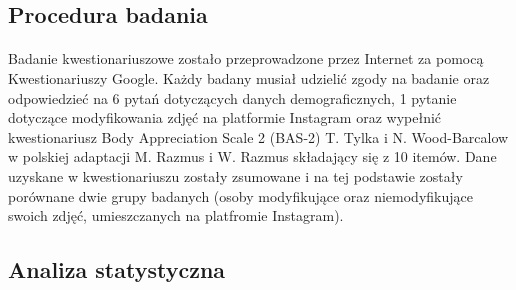 \documentclass[12pt,a4paper,final,oneside,onecolumn,titlepage]{article}
\begin{document}
\subsection*{\normalsize{\textbf{Procedura badania}}}
\paragraph{}
Badanie kwestionariuszowe zostało przeprowadzone przez Internet za pomocą Kwestionariuszy Google. Każdy badany musiał udzielić zgody na badanie oraz odpowiedzieć na 6 pytań dotyczących danych demograficznych, 1 pytanie dotyczące modyfikowania zdjęć na platformie Instagram oraz wypełnić kwestionariusz Body Appreciation Scale 2 (BAS-2) T. Tylka i N. Wood-Barcalow w polskiej adaptacji M. Razmus i W. Razmus składający się z 10 itemów. Dane uzyskane w kwestionariuszu zostały zsumowane i na tej podstawie zostały porównane dwie grupy badanych (osoby modyfikujące oraz niemodyfikujące swoich zdjęć, umieszczanych na platfromie Instagram).
\subsection*{\normalsize{\textbf{Analiza statystyczna}}}
\end{document}
